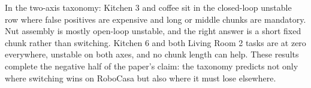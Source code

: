 \documentclass[11pt]{article}
\begin{document}
In the two-axis taxonomy: Kitchen 3 and coffee sit in the closed-loop
unstable row where false positives are expensive and long or middle chunks
are mandatory. Nut assembly is mostly open-loop unstable, and the right
answer is a short fixed chunk rather than switching. Kitchen 6 and both
Living Room 2 tasks are at zero everywhere, unstable on both axes, and no
chunk length can help. These results complete the negative half of the
paper's claim: the taxonomy predicts not only where switching wins on
RoboCasa but also where it must lose elsewhere.
\end{document}
